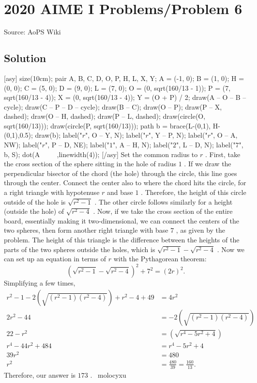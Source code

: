 \documentclass[12pt]{article}
\begin{document}
\section*{{2020 AIME I Problems/Problem 6}}
Source: AoPS Wiki

\subsection*{Solution}
[asy] size(10cm); pair A, B, C, D, O, P, H, L, X, Y; A = (-1, 0); B = (1, 0); H = (0, 0); C = (5, 0); D = (9, 0); L = (7, 0); O = (0, sqrt(160/13 - 1)); P = (7, sqrt(160/13 - 4)); X = (0, sqrt(160/13 - 4)); Y = (O + P) / 2; draw(A -- O -- B -- cycle); draw(C -- P -- D -- cycle); draw(B -- C); draw(O -- P); draw(P -- X, dashed); draw(O -- H, dashed); draw(P -- L, dashed); draw(circle(O, sqrt(160/13))); draw(circle(P, sqrt(160/13))); path b = brace(L-(0,1), H-(0,1),0.5); draw(b); label("$r$", O -- Y, N); label("$r$", Y -- P, N); label("$r$", O -- A, NW); label("$r$", P -- D, NE); label("$1$", A -- H, N); label("$2$", L -- D, N); label("$7$", b, S); dot(A^^B^^C^^D^^O^^P^^H^^L^^X^^Y,linewidth(4)); [/asy] Set the common radius to $r$ . First, take the cross section of the sphere sitting in the hole of radius $1$ . If we draw the perpendicular bisector of the chord (the hole) through the circle, this line goes through the center. Connect the center also to where the chord hits the circle, for a right triangle with hypotenuse $r$ and base $1$ . Therefore, the height of this circle outside of the hole is $\sqrt{r^2-1}$ . The other circle follows similarly for a height (outside the hole) of $\sqrt{r^2-4}$ . Now, if we take the cross section of the entire board, essentially making it two-dimensional, we can connect the centers of the two spheres, then form another right triangle with base $7$ , as given by the problem. The height of this triangle is the difference between the heights of the parts of the two spheres outside the holes, which is $\sqrt{r^2-1} - \sqrt{r^2-4}$ . Now we can set up an equation in terms of $r$ with the Pythagorean theorem: \[\left(\sqrt{r^2-1} - \sqrt{r^2-4}\right)^2 + 7^2 = (2r)^2.\] Simplifying a few times, \begin{align*} r^2 - 1 - 2\left(\sqrt{(r^2-1)(r^2-4)}\right) + r^2 - 4 + 49 &= 4r^2 \\ 2r^2-44 &= -2\left(\sqrt{(r^2-1)(r^2-4)}\right) \\ 22-r^2 &= \left(\sqrt{r^4 - 5r^2 + 4}\right) \\ r^4 -44r^2 + 484 &= r^4 - 5r^2 + 4 \\ 39r^2&=480 \\ r^2&=\frac{480}{39} = \frac{160}{13}. \end{align*} Therefore, our answer is $\boxed{173}$ . ~molocyxu
\end{document}
